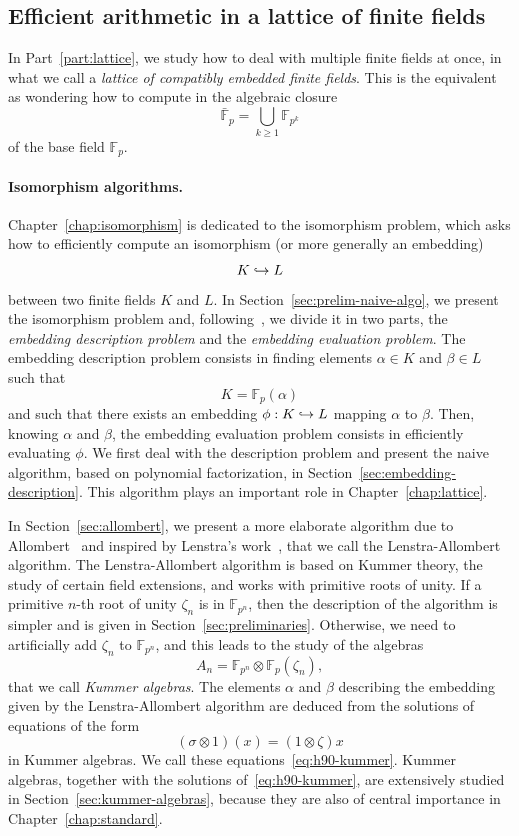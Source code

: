 \subsection{Efficient arithmetic in a lattice of finite fields}
In Part~\ref{part:lattice}, we study how to deal with multiple finite fields
at once, in what we call a \emph{lattice of compatibly embedded finite fields}.
This is the equivalent as wondering how to compute in the algebraic closure
\[
  \bar{\mathbb{F}}_{p} = \bigcup_{k\geq1}\mathbb{F}_{p^k}
\]
of the base field $\mathbb{F}_p$.

\paragraph{Isomorphism algorithms.}
Chapter~\ref{chap:isomorphism} is dedicated to the isomorphism problem, which
asks how to efficiently compute an isomorphism (or more generally an embedding)
\[
  K \hookrightarrow L
\]
between two finite fields $K$ and $L$. In Section~\ref{sec:prelim-naive-algo},
we present the isomorphism problem and, following~\cite{BDDFS17}, we divide it
in two parts, the \emph{embedding description problem} and the \emph{embedding
evaluation problem}. The embedding description problem consists in finding
elements $\alpha\in K$ and $\beta\in L$ such that
\[
  K = \mathbb{F}_{p}(\alpha)
\]
and such that there exists an embedding $\phi:K\hookrightarrow L$ mapping $\alpha$ to
$\beta$. Then, knowing $\alpha$ and $\beta$, the embedding evaluation problem
consists in efficiently evaluating $\phi$. We first deal with the description
problem and present the naive algorithm, based on polynomial factorization, in
Section~\ref{sec:embedding-description}. This algorithm plays an important role
in Chapter~\ref{chap:lattice}.

In Section~\ref{sec:allombert}, we present a more elaborate algorithm due to
Allombert~\cite{Allombert02} and inspired by Lenstra's work~\cite{Lenstra91},
that we call the Lenstra-Allombert algorithm. The Lenstra-Allombert algorithm is
based on Kummer theory, the study of certain field extensions, and works with
primitive roots of unity. If a primitive $n$-th root of unity $\zeta_n$ is in
$\mathbb{F}_{p^n}$, then the description of the algorithm is simpler and is
given in Section~\ref{sec:preliminaries}. Otherwise, we need to artificially add
$\zeta_n$ to $\mathbb{F}_{p^n}$, and this leads to the study of the algebras
\[
  A_n = \mathbb{F}_{p^{n}}\otimes\mathbb{F}_{p}(\zeta_n),
\]
that we call \emph{Kummer algebras}. The elements $\alpha$ and $\beta$
describing the embedding given by the Lenstra-Allombert algorithm are deduced
from the solutions of equations of the form
\[
  (\sigma\otimes 1)(x) = (1\otimes\zeta)x
\]
in Kummer algebras. We call these equations~\eqref{eq:h90-kummer}.
Kummer algebras, together with the solutions of~\eqref{eq:h90-kummer}, are
extensively studied in Section~\ref{sec:kummer-algebras}, because they are also
of central importance in Chapter~\ref{chap:standard}.

